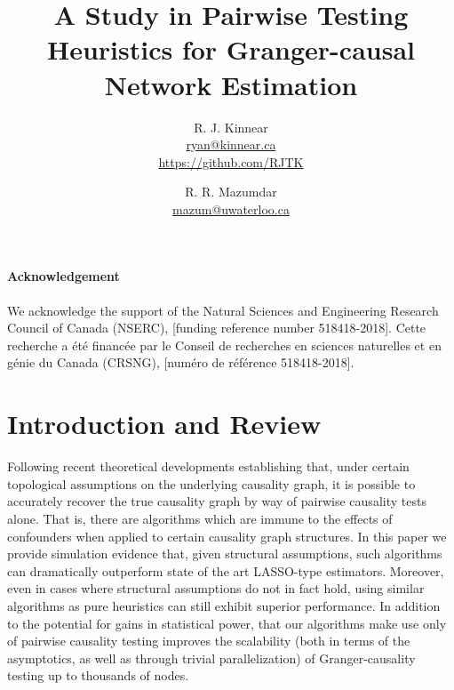 \documentclass[12pt]{article}
\title{A Study in Pairwise Testing Heuristics for Granger-causal Network Estimation}
\author{R. J. Kinnear \\
  \small\href{mailto:ryan@kinnear.ca}{ryan@kinnear.ca} \\
  \small\url{https://github.com/RJTK} \and R. R. Mazumdar \\
  \small\href{mailto:mazum@uwaterloo.ca}{mazum@uwaterloo.ca}}
\begin{document}
\maketitle
{}


\paragraph{Acknowledgement}
We acknowledge the support of the Natural Sciences and Engineering Research Council of Canada (NSERC), [funding reference number 518418-2018].  Cette recherche a été financée par le Conseil de recherches en sciences naturelles et en génie du Canada (CRSNG), [numéro de référence 518418-2018].

\clearpage


\section{Introduction and Review}
\label{sec:introduction}
Following recent theoretical developments \cite{my_GC_paper}
establishing that, under certain topological assumptions on the
underlying causality graph, it is possible to accurately recover the
true causality graph by way of pairwise causality tests alone.  That
is, there are algorithms which are immune to the effects of
confounders when applied to certain causality graph structures.  In
this paper we provide simulation evidence that, given structural
assumptions, such algorithms can dramatically outperform state of the
art LASSO-type estimators.  Moreover, even in cases where structural
assumptions do not in fact hold, using similar algorithms as pure
heuristics can still exhibit superior performance.  In addition to the
potential for gains in statistical power, that our algorithms make use
only of pairwise causality testing improves the scalability (both in
terms of the asymptotics, as well as through trivial parallelization)
of Granger-causality testing up to thousands of nodes.
\end{document}
